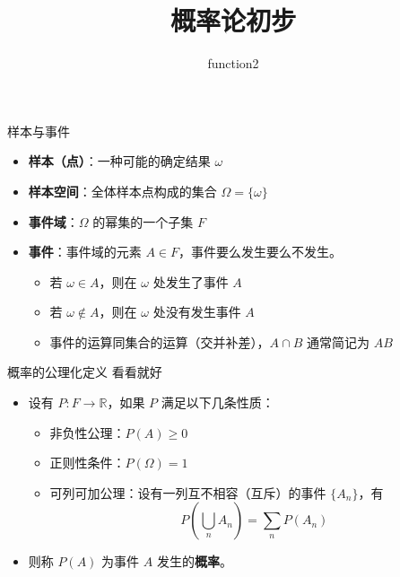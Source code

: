\documentclass{beamer}
\title{概率论初步}
\author{function2}
\begin{document}
    \begin{frame}
        \titlepage
    \end{frame}

    \begin{frame}{样本与事件}
        \begin{itemize}
            \setlength{\itemsep}{10pt}
            \item \textbf{样本（点）}：一种可能的确定结果 $\omega$
            \item \textbf{样本空间}：全体样本点构成的集合 $\Omega=\{\omega\}$
            \item \textbf{事件域}：$\Omega$ 的幂集的一个子集 $F$
            \item \textbf{事件}：事件域的元素 $ A \in F $，事件要么发生要么不发生。
            \begin{itemize}
                \item 若 $\omega \in A$，则在 $\omega$ 处发生了事件 $A$
                \item 若 $\omega \notin A$，则在 $\omega$ 处没有发生事件 $A$
                \item 事件的运算同集合的运算（交并补差），$A\cap B$ 通常简记为 $AB$
            \end{itemize}
        \end{itemize}
    \end{frame}

    \begin{frame}{概率的公理化定义}
        {看看就好}
        \begin{itemize}
            \setlength{\itemsep}{10pt}
            \item 设有 $P:F \to \mathbb{R}$，如果 $P$ 满足以下几条性质：
            \begin{itemize}
                \item 非负性公理：$P(A) \ge 0$
                \item 正则性条件：$P(\Omega) = 1$
                \item 可列可加公理：设有一列互不相容（互斥）的事件 $\{A_n\}$，有
                $$
                    P\left(\bigcup_{n}{A_n}\right) = \sum_{n} P(A_n)
                $$
            \end{itemize}
            \item 则称 $P(A)$ 为事件 $A$ 发生的\textbf{概率}。
        \end{itemize}
    \end{frame}
\end{document}
